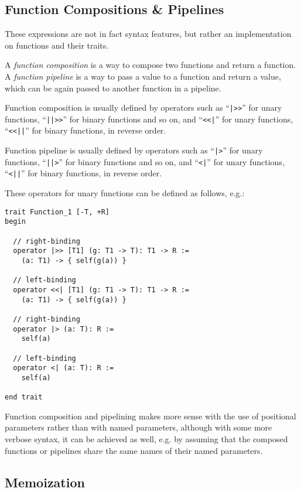 \subsection{Function Compositions \& Pipelines}
\label{sec:function-compositions}
\label{sec:function-pipelines}

These expressions are not in fact syntax features, but rather an implementation on functions and their traits. 

A {\em function composition} is a way to compose two functions and return a function. A {\em function pipeline} is a way to pass a value to a function and return a value, which can be again passed to another function in a pipeline. 

Function composition is usually defined by operators such as ``\lstinline!|>>!'' for unary functions, ``\lstinline!||>>!'' for binary functions and so on, and ``\lstinline!<<|!'' for unary functions, ``\lstinline!<<||!'' for binary functions, in reverse order. 

Function pipeline is usually defined by operators such as ``\lstinline!|>!'' for unary functions, ``\lstinline!||>!'' for binary functions and so on, and ``\lstinline!<|!'' for unary functions, ``\lstinline!<||!'' for binary functions, in reverse order. 

These operators for unary functions can be defined as follows, e.g.:
\begin{lstlisting}
trait Function_1 [-T, +R]
begin

  // right-binding
  operator |>> [T1] (g: T1 -> T): T1 -> R := 
    (a: T1) -> { self(g(a)) }

  // left-binding
  operator <<| [T1] (g: T1 -> T): T1 -> R :=
    (a: T1) -> { self(g(a)) }

  // right-binding
  operator |> (a: T): R :=
    self(a)

  // left-binding
  operator <| (a: T): R := 
    self(a)
    
end trait
\end{lstlisting}

Function composition and pipelining makes more sense with the use of positional parameters rather than with named parameters, although with some more verbose syntax, it can be achieved as well, e.g. by assuming that the composed functions or pipelines share the same names of their named parameters. 





\subsection{Memoization}
\label{sec:memoization}

